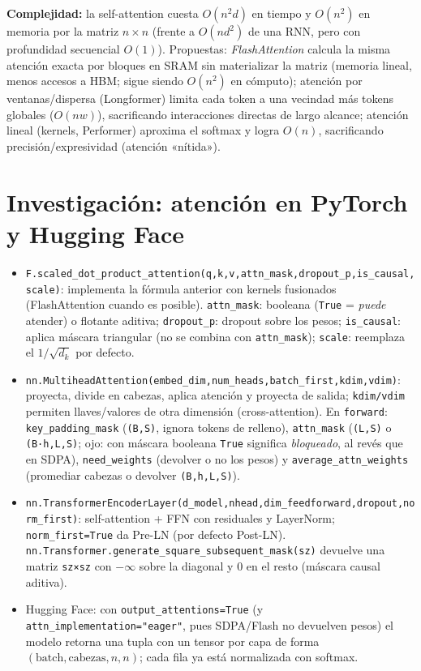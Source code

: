 \documentclass[10pt,letterpaper]{article}
\newcommand{\dk}{d_k}
\begin{document}
\textbf{Complejidad:} la self-attention cuesta $O(n^2d)$ en tiempo y $O(n^2)$ en memoria por la matriz $n\times n$ (frente a $O(nd^2)$ de una RNN, pero con profundidad secuencial $O(1)$). Propuestas: \emph{FlashAttention} calcula la misma atención exacta por bloques en SRAM sin materializar la matriz (memoria lineal, menos accesos a HBM; sigue siendo $O(n^2)$ en cómputo); atención por ventanas/dispersa (Longformer) limita cada token a una vecindad más tokens globales ($O(nw)$), sacrificando interacciones directas de largo alcance; atención lineal (kernels, Performer) aproxima el softmax y logra $O(n)$, sacrificando precisión/expresividad (atención «nítida»).

\section{Investigación: atención en PyTorch y Hugging Face}
\begin{itemize}
\item \texttt{F.scaled\_dot\_product\_attention(q,k,v,attn\_mask,dropout\_p,is\_causal,scale)}: implementa la fórmula anterior con kernels fusionados (FlashAttention cuando es posible). \texttt{attn\_mask}: booleana (\texttt{True} = \emph{puede} atender) o flotante aditiva; \texttt{dropout\_p}: dropout sobre los pesos; \texttt{is\_causal}: aplica máscara triangular (no se combina con \texttt{attn\_mask}); \texttt{scale}: reemplaza el $1/\sqrt{\dk}$ por defecto.
\item \texttt{nn.MultiheadAttention(embed\_dim,num\_heads,batch\_first,kdim,vdim)}: proyecta, divide en cabezas, aplica atención y proyecta de salida; \texttt{kdim/vdim} permiten llaves/valores de otra dimensión (cross-attention). En \texttt{forward}: \texttt{key\_padding\_mask} (\texttt{(B,S)}, ignora tokens de relleno), \texttt{attn\_mask} (\texttt{(L,S)} o \texttt{(B·h,L,S)}; ojo: con máscara booleana \texttt{True} significa \emph{bloqueado}, al revés que en SDPA), \texttt{need\_weights} (devolver o no los pesos) y \texttt{average\_attn\_weights} (promediar cabezas o devolver \texttt{(B,h,L,S)}).
\item \texttt{nn.TransformerEncoderLayer(d\_model,nhead,dim\_feedforward,dropout,norm\_first)}: self-attention + FFN con residuales y LayerNorm; \texttt{norm\_first=True} da Pre-LN (por defecto Post-LN). \texttt{nn.Transformer.}\allowbreak\texttt{generate\_square\_}\allowbreak\texttt{subsequent\_mask(sz)} devuelve una matriz \texttt{sz×sz} con $-\infty$ sobre la diagonal y 0 en el resto (máscara causal aditiva).
\item Hugging Face: con \texttt{output\_attentions=True} (y \texttt{attn\_implementation="eager"}, pues SDPA/Flash no devuelven pesos) el modelo retorna una tupla con un tensor por capa de forma $(\text{batch},\text{cabezas},n,n)$; cada fila ya está normalizada con softmax.
\end{itemize}
\end{document}

